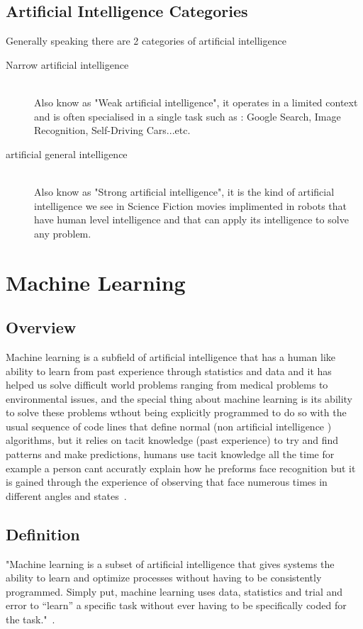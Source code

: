     \subsection{Artificial Intelligence Categories}
        Generally speaking there are 2 categories of artificial intelligence ~\cite{ai}

            \begin{description} 
            \item[Narrow artificial intelligence] \hfill \\
                Also know as "Weak artificial intelligence", it operates in a limited context and is often specialised in a single task such as : Google Search, Image Recognition, Self-Driving Cars...etc.
            \item[artificial general intelligence] \hfill \\
                Also know as "Strong artificial intelligence", it is the kind of artificial intelligence we see in Science Fiction movies implimented in robots that have human level intelligence and that can apply its intelligence to solve any problem.
            \end{description}
\section{Machine Learning}
    \subsection{Overview}
        Machine learning is a subfield of artificial intelligence that has a human like ability to learn from past experience through statistics and data and it has helped us solve difficult world problems ranging from medical problems to environmental issues, and the special thing about machine learning is its ability to solve these problems wthout being explicitly programmed to do so with the usual sequence of code lines that define normal (non artificial intelligence ) algorithms, but it relies on tacit knowledge (past experience) to try and find patterns and make predictions, humans use tacit knowledge all the time for example a person cant accuratly explain how he preforms face recognition but it is gained through the experience of observing that face numerous times in different angles and states~\cite{ml}.

    \subsection{Definition}
        "Machine learning is a subset of artificial intelligence that gives systems the ability to learn and optimize processes without having to be consistently programmed. Simply put, machine learning uses data, statistics and trial and error to “learn” a specific task without ever having to be specifically coded for the task."~\cite{ml}.

